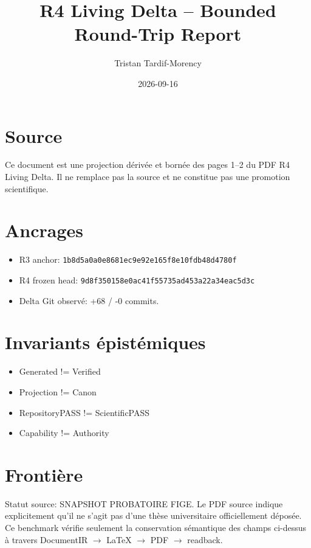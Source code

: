 \documentclass[11pt,letterpaper]{article}
\title{R4 Living Delta -- Bounded Round-Trip Report}
\author{Tristan Tardif-Morency}
\date{2026-09-16}
\begin{document}
\maketitle
\section*{Source}
Ce document est une projection dérivée et bornée des pages 1--2 du PDF R4 Living Delta. Il ne remplace pas la source et ne constitue pas une promotion scientifique.
\section*{Ancrages}
\begin{itemize}
\item R3 anchor: \texttt{1b8d5a0a0e8681ec9e92e165f8e10fdb48d4780f}
\item R4 frozen head: \texttt{9d8f350158e0ac41f55735ad453a22a34eac5d3c}
\item Delta Git observé: +68 / -0 commits.
\end{itemize}
\section*{Invariants épistémiques}
\begin{itemize}
\item Generated != Verified
\item Projection != Canon
\item RepositoryPASS != ScientificPASS
\item Capability != Authority
\end{itemize}
\section*{Frontière}
Statut source: SNAPSHOT PROBATOIRE FIGE. Le PDF source indique explicitement qu'il ne s'agit pas d'une thèse universitaire officiellement déposée. Ce benchmark vérifie seulement la conservation sémantique des champs ci-dessus à travers DocumentIR $\rightarrow$ LaTeX $\rightarrow$ PDF $\rightarrow$ readback.
\end{document}
